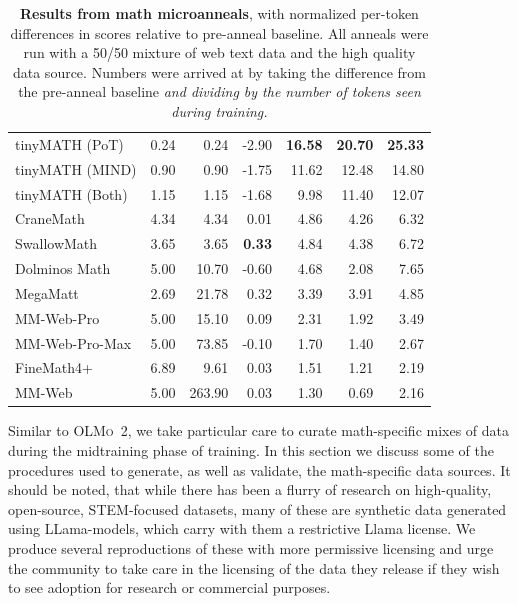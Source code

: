\documentclass[table]{ai2style/ai2}
\newcommand{\oldOlmo}{OLMo\xspace}
\newcommand{\olmotoo}{\textsc{\oldOlmo~2}\xspace}
\begin{document}
{{\begin{table}[t]
\begin{tabular}{lrrrrrr}
\midrule
\rowcolor{ai2offwhite} tinyMATH (PoT)     & 0.24 & 0.24 & -2.90 & {\bf{16.58}} & {\bf{20.70}} & {\bf{25.33}} \\
tinyMATH (MIND)    & 0.90 & 0.90 & -1.75 & 11.62 & 12.48 & 14.80 \\
\rowcolor{ai2offwhite} tinyMATH (Both)    & 1.15 & 1.15 & -1.68 & 9.98  & 11.40 & 12.07 \\
CraneMath          & 4.34 & 4.34 & 0.01  & 4.86  & 4.26  & 6.32 \\
\rowcolor{ai2offwhite} SwallowMath        & 3.65 & 3.65 & {\bf{0.33}}  & 4.84  & 4.38  & 6.72 \\
Dolminos Math      & 5.00 & 10.70 & -0.60 & 4.68 & 2.08  & 7.65 \\
\rowcolor{ai2offwhite} MegaMatt           & 2.69 & 21.78 & 0.32  & 3.39 & 3.91  & 4.85 \\
MM-Web-Pro        & 5.00 & 15.10 & 0.09  & 2.31 & 1.92  & 3.49 \\
\rowcolor{ai2offwhite} MM-Web-Pro-Max         & 5.00 & 73.85 & -0.10 & 1.70 & 1.40  & 2.67 \\
FineMath4+      & 6.89 & 9.61  & 0.03  & 1.51 & 1.21  & 2.19 \\
\rowcolor{ai2offwhite} MM-Web        & 5.00 & 263.90 & 0.03 & 1.30 & 0.69 & 2.16 \\
\bottomrule
\end{tabular}
\caption{\textbf{Results from math microanneals}, with normalized per-token differences in scores relative to pre-anneal baseline. All anneals were run with a 50/50 mixture of web text data and the high quality data source. Numbers were arrived at by taking the difference from the pre-anneal baseline \emph{and dividing by the number of tokens seen during training.}}
\label{tab:midtraining-math-normalized}
\end{table}

Similar to \olmotoo, we take particular care to curate math-specific mixes of data during the midtraining phase of training. In this section we discuss some of the procedures used to generate, as well as validate, the math-specific data sources. It should be noted, that while there has been a flurry of research on high-quality, open-source, STEM-focused datasets, many of these are synthetic data generated using LLama-models, which carry with them a restrictive Llama license. We produce several reproductions of these with more permissive licensing and urge the community to take care in the licensing of the data they release if they wish to see adoption for research or commercial purposes.

}}
\end{document}
